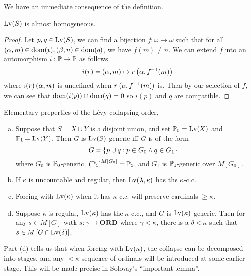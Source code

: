 We have an immediate consequence of the definition.
\begin{proposition}
    \(\Lv(S)\) is almost homogeneous.
\end{proposition}
\begin{proof}
    Let \(p,q\in\Lv(S)\), we can find a bijection \(f:\omega\to\omega\) such that
    for all \((\alpha,m)\in\dom(p), (\beta,n)\in\dom(q)\), we have \(f(m) \ne n\).
    We can extend \(f\) into an automorphism \(i:\P\to\P\) as follows
    \[ i(r) = \paren{\alpha,m}\mapsto r\paren{\alpha, f^{-1}(m)} \]
    where \(i(r)\paren{\alpha,m}\) is undefined when \(r\paren{\alpha,f^{-1}(m)}\) is.
    Then by our selection of \(f\), we can see that \(\dom(i(p)) \cap\dom(q) = 0\) so \(i(p)\) and \(q\) are compatible.
\end{proof}

\begin{lemma} \label{lemma:levy_elementary}
    Elementary properties of the Lévy collapsing order,
    \begin{enumerate}[(a)]
        \item Suppose that \(S = X\cup Y\) is a disjoint union,
            and set \(\P_0 = \Lv(X)\) and \(\P_1 = \Lv(Y)\).
            Then \(G\) is \(\Lv(S)\)-generic iff \(G\) is of the form
            \[G = \set{p\cup q: p\in G_0\land q\in G_1 }\]
            where \(G_0\) is \(\P_0\)-generic, \(\paren{\P_1}^{M[G_0]} = \P_1\),
            and \(G_1\) is \(\P_1\)-generic over \(M[G_0]\).
        \item If \(\kappa\) is uncountable and regular, %
            then \(\Lv(\lambda,\kappa)\) has the \(\kappa\)-c.c.
        \item Forcing with \(\Lv(\kappa)\) when it has \(\kappa\)-c.c. will preserve cardinals \(\geq \kappa\).
        \item Suppose \(\kappa\) is regular, \(\Lv(\kappa)\) has the \(\kappa\)-c.c., and
            \(G\) is \(\Lv(\kappa)\)-generic.
            Then for any \(s\in M[G]\) with \(s:\gamma \to \mathbf{ORD}\) where \(\gamma < \kappa\),
            there is a \(\delta<\kappa\) such that \(s\in M\sq{G\cap\Lv(\delta)}\).
    \end{enumerate}
\end{lemma}

\begin{remark}

    Part (d) tells us that when forcing with \(\Lv(\kappa)\),
    the collapse can be decomposed into stages, and
    any \(<\kappa\) sequence of ordinals will be introduced at some earlier stage.
    This will be made precise in Solovay's ``important lemma''.
\end{remark}


